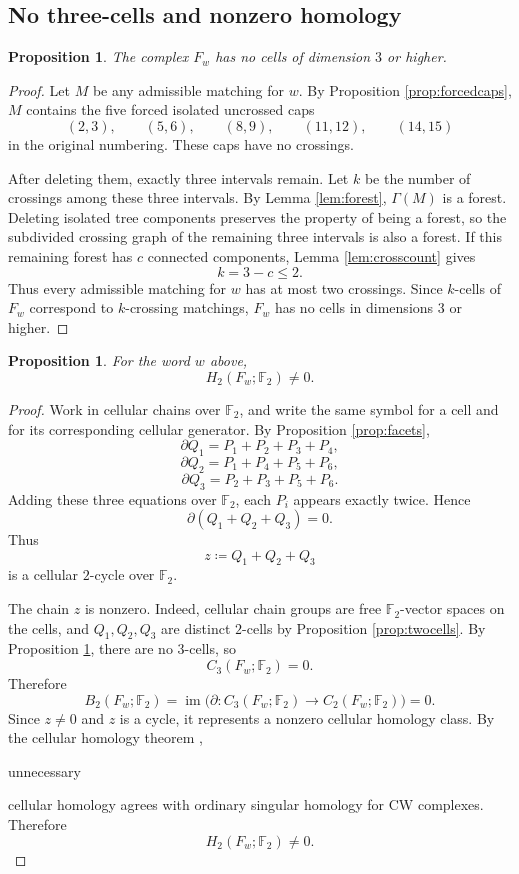 \documentclass[12pt]{article}
\newcommand{\Ftwo}{\mathbb{F}_2}
\newcommand{\defeq}{\coloneqq}
\newtheorem{proposition}[theorem]{Proposition}
\theoremstyle{definition}
\newcommand{\review}[1]{\begin{reviewbox}#1\end{reviewbox}}
\begin{document}
\subsection{No three-cells and nonzero homology}

\begin{proposition}\label{prop:nohigh}
The complex \(F_w\) has no cells of dimension \(3\) or higher.
\end{proposition}

\begin{proof}
Let \(M\) be any admissible matching for \(w\).  By Proposition \ref{prop:forcedcaps}, \(M\) contains the five forced isolated uncrossed caps
\[
(2,3),\qquad (5,6),\qquad (8,9),\qquad (11,12),\qquad (14,15)
\]
in the original numbering.  These caps have no crossings.

After deleting them, exactly three intervals remain.  Let \(k\) be the number of crossings among these three intervals.  By Lemma \ref{lem:forest}, \(\Gamma(M)\) is a forest.  Deleting isolated tree components preserves the property of being a forest, so the subdivided crossing graph of the remaining three intervals is also a forest.  If this remaining forest has \(c\) connected components, Lemma \ref{lem:crosscount} gives
\[
k=3-c\le 2.
\]
Thus every admissible matching for \(w\) has at most two crossings.  Since \(k\)-cells of \(F_w\) correspond to \(k\)-crossing matchings, \(F_w\) has no cells in dimensions \(3\) or higher.
\end{proof}

\begin{proposition}\label{prop:homology}
For the word \(w\) above,
\[
H_2(F_w;\Ftwo)\neq 0.
\]
\end{proposition}

\begin{proof}
Work in cellular chains over \(\Ftwo\), and write the same symbol for a cell and for its corresponding cellular generator.  By Proposition \ref{prop:facets},
\[
\partial Q_1=P_1+P_2+P_3+P_4,
\]
\[
\partial Q_2=P_1+P_4+P_5+P_6,
\]
\[
\partial Q_3=P_2+P_3+P_5+P_6.
\]
Adding these three equations over \(\Ftwo\), each \(P_i\) appears exactly twice.  Hence
\[
\partial(Q_1+Q_2+Q_3)=0.
\]
Thus
\[
z\defeq Q_1+Q_2+Q_3
\]
is a cellular \(2\)-cycle over \(\Ftwo\).

The chain \(z\) is nonzero.  Indeed, cellular chain groups are free \(\Ftwo\)-vector spaces on the cells, and \(Q_1,Q_2,Q_3\) are distinct \(2\)-cells by Proposition \ref{prop:twocells}.  By Proposition \ref{prop:nohigh}, there are no \(3\)-cells, so
\[
C_3(F_w;\Ftwo)=0.
\]
Therefore
\[
B_2(F_w;\Ftwo)=\operatorname{im}\bigl(\partial:C_3(F_w;\Ftwo)\to C_2(F_w;\Ftwo)\bigr)=0.
\]
Since \(z\neq 0\) and \(z\) is a cycle, it represents a nonzero cellular homology class.  By the cellular homology theorem \cite[Chapter 2]{Hatcher},\review{unnecessary} cellular homology agrees with ordinary singular homology for CW complexes.  Therefore
\[
H_2(F_w;\Ftwo)\neq 0.
\]
\end{proof}
\end{document}
